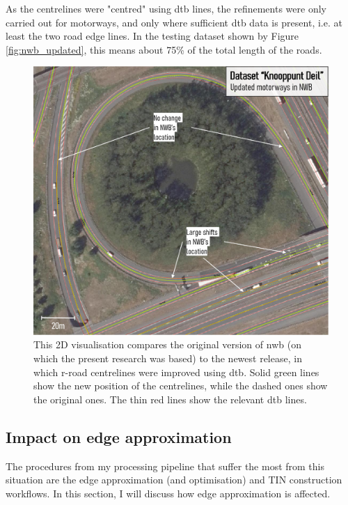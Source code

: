 As the centrelines were "centred" using \ac{dtb} lines, the refinements were only carried out for motorways, and only where sufficient \ac{dtb} data is present, i.e. at least the two road edge lines. In the testing dataset shown by Figure \ref{fig:nwb_updated}, this means about 75\% of the total length of the roads.

\begin{figure}
    \centering
    \includegraphics[width=\linewidth]{final_report/figs/nwb_updated_geometry.png}
    \caption[Figure illustrating recent NWB improvements]{This 2D visualisation compares the original version of \ac{nwb} (on which the present research was based) to the newest release, in which \ac{r-road} centrelines were improved using \ac{dtb}. Solid green lines show the new position of the centrelines, while the dashed ones show the original ones. The thin red lines show the relevant \ac{dtb} lines.}
    \label{fig:nwb_updated_geometry}
\end{figure}

\subsection{Impact on edge approximation}
\label{sub:nwb_updated_edgeapproximation}

The procedures from my processing pipeline that suffer the most from this situation are the edge approximation (and optimisation) and TIN construction workflows. In this section, I will discuss how edge approximation is affected.

